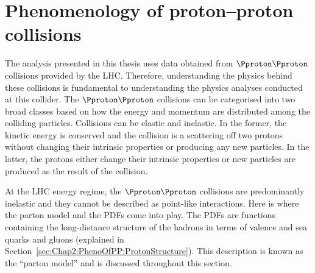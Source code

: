 \section{Phenomenology of proton--proton collisions}
\label{sec:Chap2:PhenoOfPP}


The analysis presented in this thesis uses data obtained from $\Pproton\Pproton$ collisions 
provided by the LHC.
Therefore, understanding the physics behind these collisions is fundamental to understanding the physics
analyses conducted at this collider.
The $\Pproton\Pproton$ collisions can be categorised into two broad classes based on how 
the energy and momentum are distributed among the colliding particles. Collisions can be elastic and inelastic.
In the former, the kinetic energy is conserved and the collision is a scattering off 
two protons without changing their intrinsic properties or producing any new particles.
In the latter, the protons either change their intrinsic properties or new particles
are produced as the result of the collision.

At the LHC energy regime, the $\Pproton \Pproton$ collisions are predominantly
inelastic and they cannot be described as point-like interactions.
Here is where the parton model and the PDFs come into play.
The PDFs are functions containing the long-distance structure of the hadrons in 
terms of valence and sea quarks and gluons (explained in Section~\ref{sec:Chap2:PhenoOfPP:ProtonStructure}). 
This description is known as the ``parton model'' and is discussed throughout this section.

